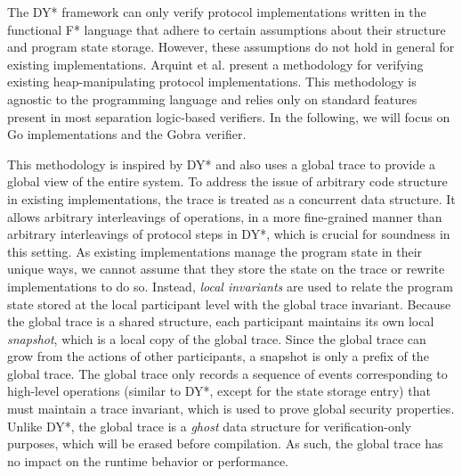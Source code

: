 The DY* framework can only verify protocol implementations written in the functional F* language that adhere to certain assumptions about their structure and program state storage.
However, these assumptions do not hold in general for existing implementations.
Arquint et al.\cite{} present a methodology for verifying existing heap-manipulating protocol implementations. This methodology is agnostic to the programming language and relies only on standard features present in most separation logic-based verifiers. In the following, we will focus on Go implementations and the Gobra\cite{} verifier.

This methodology is inspired by DY* and also uses a global trace to provide a global view of the entire system.
To address the issue of arbitrary code structure in existing implementations, the trace is treated as a concurrent data structure. It allows arbitrary interleavings of operations, in a more fine-grained manner than arbitrary interleavings of protocol steps in DY*, which is crucial for soundness in this setting.
As existing implementations manage the program state in their unique ways, we cannot assume that they store the state on the trace or rewrite implementations to do so. Instead, \emph{local invariants} are used to relate the program state stored at the local participant level with the global trace invariant.
Because the global trace is a shared structure, each participant maintains its own local \emph{snapshot}, which is a local copy of the global trace. Since the global trace can grow from the actions of other participants, a snapshot is only a prefix of the global trace. 
The global trace only records a sequence of events corresponding to high-level operations (similar to DY*, except for the state storage entry) that must maintain a trace invariant, which is used to prove global security properties.
Unlike DY*, the global trace is a \emph{ghost} data structure for verification-only purposes, which will be erased before compilation. As such, the global trace has no impact on the runtime behavior or performance.

